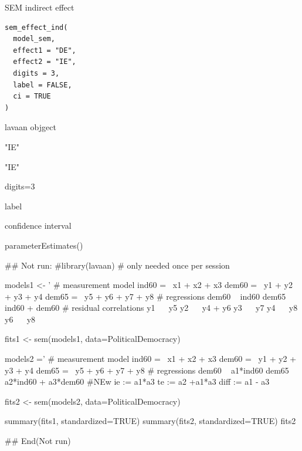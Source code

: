 \documentclass[a4paper]{book}
\begin{document}
%
\begin{Description}
SEM indirect effect
\end{Description}
%
\begin{Usage}
\begin{verbatim}
sem_effect_ind(
  model_sem,
  effect1 = "DE",
  effect2 = "IE",
  digits = 3,
  label = FALSE,
  ci = TRUE
)
\end{verbatim}
\end{Usage}
%
\begin{Arguments}
\begin{ldescription}
\item[\code{model\_sem}] lavaan objgect

\item[\code{effect1}] "IE"

\item[\code{effect2}] "IE"

\item[\code{digits}] digits=3

\item[\code{label}] label

\item[\code{ci}] confidence interval
\end{ldescription}
\end{Arguments}
%
\begin{Value}
parameterEstimates()
\end{Value}
%
\begin{Examples}
\begin{ExampleCode}

\#\# Not run: 
#library(lavaan) # only needed once per session

models1 <- '
  # measurement model
    ind60 =~ x1 + x2 + x3
    dem60 =~ y1 + y2 + y3 + y4
    dem65 =~ y5 + y6 + y7 + y8
    # regressions
    dem60 ~ ind60
    dem65 ~ ind60 + dem60
      # residual correlations
    y1 ~~ y5
    y2 ~~ y4 + y6
    y3 ~~ y7
    y4 ~~ y8
    y6 ~~ y8

fits1 <- sem(models1, data=PoliticalDemocracy)


models2 ='
  # measurement model
    ind60 =~ x1 + x2 + x3
    dem60 =~ y1 + y2 + y3 + y4
    dem65 =~ y5 + y6 + y7 + y8
     # regressions
    dem60 ~ a1*ind60
    dem65 ~ a2*ind60 + a3*dem60
 #NEw
   ie := a1*a3
   te := a2 +a1*a3
   diff := a1 - a3

fits2 <- sem(models2, data=PoliticalDemocracy)

summary(fits1, standardized=TRUE)
summary(fits2, standardized=TRUE)
fits2 %

## End(Not run)

\end{ExampleCode}
\end{Examples}
\end{document}
